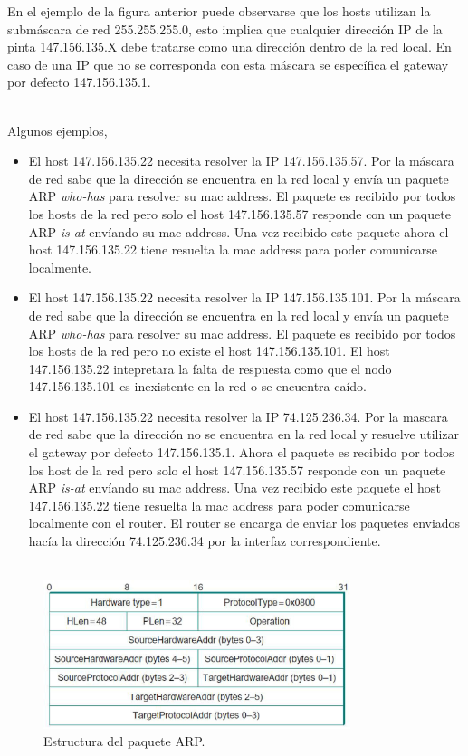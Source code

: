 En el ejemplo de la figura anterior puede observarse que los hosts utilizan la subm\'ascara de red 255.255.255.0, esto implica que cualquier direcci\'on IP de la pinta 147.156.135.X debe tratarse como una direcci\'on dentro de la red local. En caso de una IP que no se corresponda con esta m\'ascara se espec\'ifica el gateway por defecto 147.156.135.1. \\\

Algunos ejemplos,
\begin{itemize}
\item El host 147.156.135.22 necesita resolver la IP 147.156.135.57. Por la m\'ascara de red sabe que la direcci\'on se encuentra en la red local y env\'ia un paquete ARP \textit{who-has} para resolver su mac address. El paquete es recibido por todos los hosts de la red pero solo el host 147.156.135.57 responde con un paquete ARP \textit{is-at} env\'iando su mac address. Una vez recibido este paquete ahora el host 147.156.135.22 tiene resuelta la mac address para poder comunicarse localmente.

\item El host 147.156.135.22 necesita resolver la IP 147.156.135.101. Por la m\'ascara de red sabe que la direcci\'on se encuentra en la red local y env\'ia un paquete ARP \textit{who-has} para resolver su mac address. El paquete es recibido por todos los hosts de la red pero no existe el host 147.156.135.101. El host 147.156.135.22 intepretara la falta de respuesta como que el nodo 147.156.135.101 es inexistente en la red o se encuentra ca\'ido.

\item El host 147.156.135.22 necesita resolver la IP 74.125.236.34. Por la mascara de red sabe que la direcci\'on no se encuentra en la red local y resuelve utilizar el gateway por defecto 147.156.135.1. Ahora el paquete es recibido por todos los host de la red pero solo el host 147.156.135.57 responde con un paquete ARP \textit{is-at} env\'iando su mac address. Una vez recibido este paquete el host 147.156.135.22 tiene resuelta la mac address para poder comunicarse localmente con el router. El router se encarga de enviar los paquetes enviados hac\'ia la direcci\'on 74.125.236.34 por la interfaz correspondiente. \\\


\end{itemize}


\begin{figure}[H]
	\begin{center}
    \includegraphics[width=0.8\textwidth]{graficos/ARP_PACKET.png}
	\end{center}    
    \caption{Estructura del paquete ARP.}
\label{fig:ARP_PACKET} 
\end{figure}


